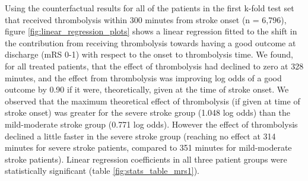 Using the counterfactual results for all of the patients in the first k-fold test set that received thrombolysis within 300 minutes from stroke onset (n = 6,796), figure \ref{fig:linear_regression_plots} shows a linear regression fitted to the shift in the contribution from receiving thrombolysis towards having a good outcome at discharge (mRS 0-1) with respect to the onset to thrombolysis time. We found, for all treated patients, that the effect of thrombolysis had declined to zero at 328 minutes, and the effect from thrombolysis was improving log odds of a good outcome by 0.90 if it were, theoretically, given at the time of stroke onset. We observed that the maximum theoretical effect of thrombolysis (if given at time of stroke onset) was greater for the severe stroke group (1.048 log odds) than the mild-moderate stroke group (0.771 log odds). However the effect of thrombolysis declined a little faster in the severe stroke group (reaching no effect at 314 minutes for severe stroke patients, compared to 351 minutes for mild-moderate stroke patients). Linear regression coefficients in all three patient groups were statistically significant (table \ref{fig:stats_table_mrs1}). 

